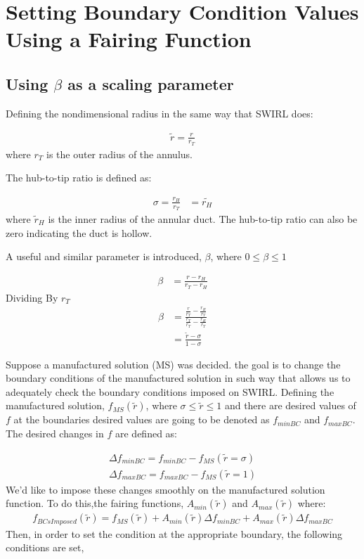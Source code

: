 \documentclass[a4paper]{article}
\begin{document}
\section{Setting Boundary Condition Values Using a Fairing Function}
\subsection{Using $\beta$ as a scaling parameter}
Defining the nondimensional radius in the same way that SWIRL does:

\begin{align*}
    \widetilde{r} = \frac{r}{r_T}
\end{align*}
where $r_T$ is the outer radius of the annulus.

The hub-to-tip ratio is defined as:

\begin{align*}
    \sigma = \frac{r_H}{r_T}
     &= \widetilde{r_H}
\end{align*}
where $\widetilde{r}_H$ is the inner radius of the annular duct. The hub-to-tip
ratio can also be zero indicating the duct is hollow.

A useful and similar parameter is introduced, $\beta$, where $ 0 \leq \beta \leq 1$


\begin{align*}
    \beta &=
    \frac{r - r_H}{r_T - r_H}
\end{align*}
Dividing By $r_T$
\begin{align*}
    \beta &= 
    \frac{
        \frac{r}{r_T} - \frac{r_H}{r_T}
}{
        \frac{r_T}{r_T} - \frac{r_H}{r_T}
}\\
&= \frac{
    \widetilde{r} - \sigma 
}{
1 - \sigma
}
\end{align*}

Suppose a manufactured solution (MS) was decided. the goal is to change the
boundary conditions of the manufactured solution in such  way that allows us 
to adequately check the boundary conditions imposed on SWIRL. Defining the 
manufactured solution, $f_{MS}(\widetilde{r})$,   where
$\sigma \leq \widetilde{r} \leq 1$ and there are desired values of $f$ at the 
boundaries desired values are going to be denoted as $f_{minBC}$ and $f_{maxBC}$.
The desired changes in $f$ are defined as:

\begin{align*}
    \Delta f_{minBC} = f_{minBC} - f_{MS}(\widetilde{r} = \sigma)\\
    \Delta f_{maxBC} = f_{maxBC} - f_{MS}(\widetilde{r} = 1) 
\end{align*}
We'd like to impose these changes smoothly on the manufactured solution function.
To do this,the fairing functions, $A_{min}(\widetilde{r})$ and $A_{max}(\widetilde{r})$
where:
\begin{align*}
    f_{BCsImposed}(\widetilde{r}) = f_{MS}(\widetilde{r}) +
    A_{min}(\widetilde{r}) \Delta f_{minBC}  +  
    A_{max}(\widetilde{r}) \Delta f_{maxBC}  
\end{align*}
Then, in order to set the condition at the appropriate boundary, the following 
conditions are set,
\end{document}
